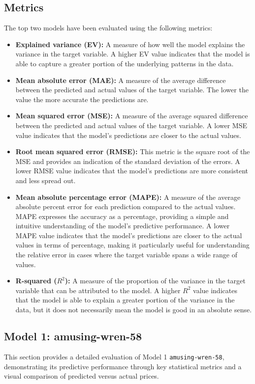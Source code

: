 \subsection{Metrics}
The top two models have been evaluated using the following metrics:
\begin{itemize}
    \item \textbf{Explained variance (EV):} A measure of how well the model explains the variance in the target variable. A higher EV value indicates that the model is able to capture a greater portion of the underlying patterns in the data.
    \item \textbf{Mean absolute error (MAE):} A measure of the average difference between the predicted and actual values of the target variable. The lower the value the more accurate the predictions are. 
    \item \textbf{Mean squared error (MSE):} A measure of the average squared difference between the predicted and actual values of the target variable. A lower MSE value indicates that the model's predictions are closer to the actual values. 
    \item \textbf{Root mean squared error (RMSE):} This metric is the square root of the MSE and provides an indication of the standard deviation of the errors. A lower RMSE value indicates that the model's predictions are more consistent and less spread out. 
    \item \textbf{Mean absolute percentage error (MAPE):} A measure of the average absolute percent error for each prediction compared to the actual values. MAPE expresses the accuracy as a percentage, providing a simple and intuitive understanding of the model's predictive performance. A lower MAPE value indicates that the model's predictions are closer to the actual values in terms of percentage, making it particularly useful for understanding the relative error in cases where the target variable spans a wide range of values.
    \item \textbf{R-squared (\( R^2 \)):} A measure of the proportion of the variance in the target variable that can be attributed to the model. A higher \( R^2 \) value indicates that the model is able to explain a greater portion of the variance in the data, but it does not necessarily mean the model is good in an absolute sense. \\
\end{itemize}

\subsection{Model 1: amusing-wren-58}
This section provides a detailed evaluation of Model 1 \texttt{amusing-wren-58}, demonstrating its predictive performance through key statistical metrics and a visual comparison of predicted versus actual prices.

